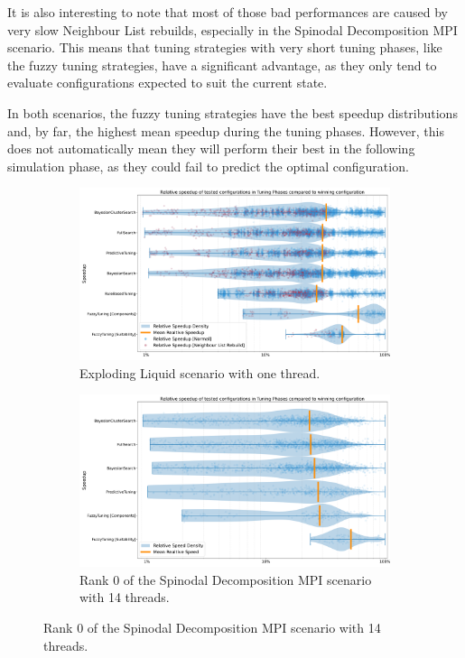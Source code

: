 It is also interesting to note that most of those bad performances are caused by very slow Neighbour List rebuilds, especially in the Spinodal Decomposition MPI scenario. This means that tuning strategies with very short tuning phases, like the fuzzy tuning strategies, have a significant advantage, as they only tend to evaluate configurations expected to suit the current state.

In both scenarios, the fuzzy tuning strategies have the best speedup distributions and, by far, the highest mean speedup during the tuning phases. However, this does not automatically mean they will perform their best in the following simulation phase, as they could fail to predict the optimal configuration.

\newpage

\begin{figure}[H]
    \centering

    \begin{subfigure}[c]{\textwidth}
        \includegraphics[width=\columnwidth,trim={1cm 0 0cm 1cm},clip]{figures/Benchmark/Observations/tuning_phase_speedup_explodingLiquid_1_zoomed.png}
        \caption{Exploding Liquid scenario with one thread.}
        \label{fig:explodingLiquidSpeedupDensity}
    \end{subfigure}


    \begin{subfigure}[c]{\textwidth}
        \includegraphics[width=\columnwidth,trim={1cm 0 0cm 1cm},clip]{figures/Benchmark/Observations/tuning_phase_speedup_SpinodalDecompositionMPI_14_0.png}
        \caption{Rank 0 of the Spinodal Decomposition MPI scenario with 14 threads.}
        \label{fig:spinodalSpeedupDensity}
    \end{subfigure}



\end{figure}
